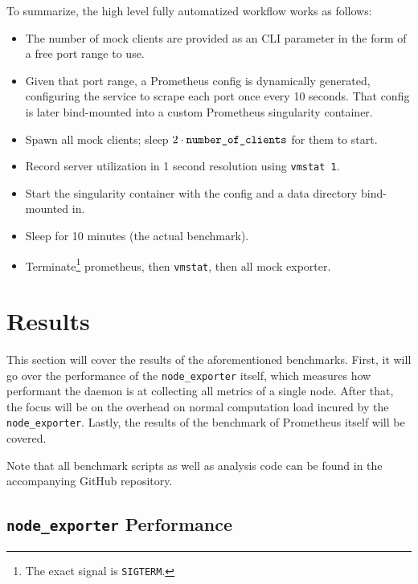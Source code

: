 To summarize, the high level fully automatized workflow works as follows:
\begin{itemize}
  \item The number of mock clients are provided as an CLI parameter in the form of a free port range to use.
  \item Given that port range, a Prometheus config is dynamically generated, configuring the service to scrape each port once every 10 seconds. That config is later bind-mounted into a custom Prometheus singularity container.
  \item Spawn all mock clients; sleep $2 \cdot \text{\texttt{number\_of\_clients}}$ for them to start.
  \item Record server utilization in 1 second resolution using \texttt{vmstat 1}.
  \item Start the singularity container with the config and a data directory bind-mounted in.
  \item Sleep for 10 minutes (the actual benchmark).
  \item Terminate\footnote{The exact signal is \texttt{SIGTERM}.} prometheus, then \texttt{vmstat}, then all mock exporter.
\end{itemize}

\section{Results}
This section will cover the results of the aforementioned benchmarks. First, it will go over the performance of the \texttt{node\_exporter} itself, which measures how performant the daemon is at collecting all metrics of a single node. After that, the focus will be on the overhead on normal computation load incured by the \texttt{node\_exporter}. Lastly, the results of the benchmark of Prometheus itself will be covered.

Note that all benchmark scripts as well as analysis code can be found in the accompanying GitHub repository.
\subsection{\texttt{node\_exporter} Performance}
